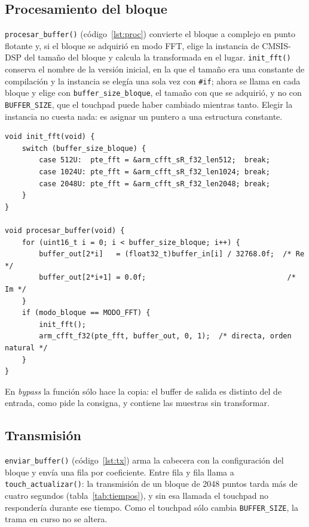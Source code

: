 \documentclass[11pt,a4paper]{article}
\begin{document}
\subsection{Procesamiento del bloque}

\texttt{procesar\_buffer()} (código~\ref{lst:proc}) convierte el bloque a
complejo en punto flotante y, si el bloque se adquirió en modo FFT, elige
la instancia de CMSIS-DSP del tamaño del bloque y calcula la transformada
en el lugar. \texttt{init\_fft()} conserva el nombre de la versión inicial,
en la que el tamaño era una constante de compilación y la instancia se
elegía una sola vez con \texttt{\#if}; ahora se llama en cada bloque y elige
con \texttt{buffer\_size\_bloque}, el tamaño con que se adquirió, y no con
\texttt{BUFFER\_SIZE}, que el touchpad puede haber cambiado mientras tanto.
Elegir la instancia no cuesta nada: es asignar un puntero a una estructura
constante.

\begin{lstlisting}[caption={Selección de la instancia y cálculo de la FFT (\texttt{source/TP3.c}).},label={lst:proc}]
void init_fft(void) {
    switch (buffer_size_bloque) {
        case 512U:  pte_fft = &arm_cfft_sR_f32_len512;  break;
        case 1024U: pte_fft = &arm_cfft_sR_f32_len1024; break;
        case 2048U: pte_fft = &arm_cfft_sR_f32_len2048; break;
    }
}

void procesar_buffer(void) {
    for (uint16_t i = 0; i < buffer_size_bloque; i++) {
        buffer_out[2*i]   = (float32_t)buffer_in[i] / 32768.0f;  /* Re */
        buffer_out[2*i+1] = 0.0f;                                 /* Im */
    }
    if (modo_bloque == MODO_FFT) {
        init_fft();
        arm_cfft_f32(pte_fft, buffer_out, 0, 1);  /* directa, orden natural */
    }
}
\end{lstlisting}

En \emph{bypass} la función sólo hace la copia: el buffer de salida es
distinto del de entrada, como pide la consigna, y contiene las muestras sin
transformar.

\subsection{Transmisión}

\texttt{enviar\_buffer()} (código~\ref{lst:tx}) arma la cabecera con la
configuración del bloque y envía una fila por coeficiente. Entre fila y
fila llama a \texttt{touch\_actualizar()}: la transmisión de un bloque de
\num{2048} puntos tarda más de cuatro segundos
(tabla~\ref{tab:tiempos}), y sin esa llamada el touchpad no respondería
durante ese tiempo. Como el touchpad sólo cambia \texttt{BUFFER\_SIZE}, la
trama en curso no se altera.
\end{document}
